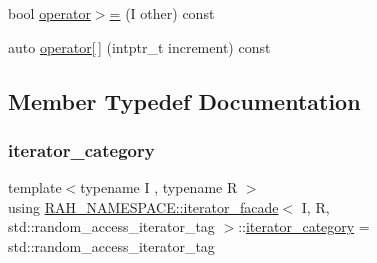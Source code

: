 \begin{DoxyCompactItemize}
\item 
bool \mbox{\hyperlink{struct_r_a_h___n_a_m_e_s_p_a_c_e_1_1iterator__facade_3_01_i_00_01_r_00_01std_1_1random__access__iterator__tag_01_4_a84bbe6bcef3c643a745795d3d3256af8}{operator$>$=}} (I other) const
\item 
auto \mbox{\hyperlink{struct_r_a_h___n_a_m_e_s_p_a_c_e_1_1iterator__facade_3_01_i_00_01_r_00_01std_1_1random__access__iterator__tag_01_4_ad9193e784c98537649a826dafd1f779f}{operator\mbox{[}$\,$\mbox{]}}} (intptr\+\_\+t increment) const
\end{DoxyCompactItemize}


\subsection{Member Typedef Documentation}
\mbox{\label{struct_r_a_h___n_a_m_e_s_p_a_c_e_1_1iterator__facade_3_01_i_00_01_r_00_01std_1_1random__access__iterator__tag_01_4_a4fa7b515e853787a85b5ec008b1bb577}} 
\subsubsection{\texorpdfstring{iterator\_category}{iterator\_category}}
{\footnotesize\ttfamily template$<$typename I , typename R $>$ \\
using \mbox{\hyperlink{struct_r_a_h___n_a_m_e_s_p_a_c_e_1_1iterator__facade}{R\+A\+H\+\_\+\+N\+A\+M\+E\+S\+P\+A\+C\+E\+::iterator\+\_\+facade}}$<$ I, R, std\+::random\+\_\+access\+\_\+iterator\+\_\+tag $>$\+::\mbox{\hyperlink{struct_r_a_h___n_a_m_e_s_p_a_c_e_1_1iterator__facade_3_01_i_00_01_r_00_01std_1_1forward__iterator__tag_01_4_a975db251eb3e0733ff4292fa11cc8f89}{iterator\+\_\+category}} =  std\+::random\+\_\+access\+\_\+iterator\+\_\+tag}



